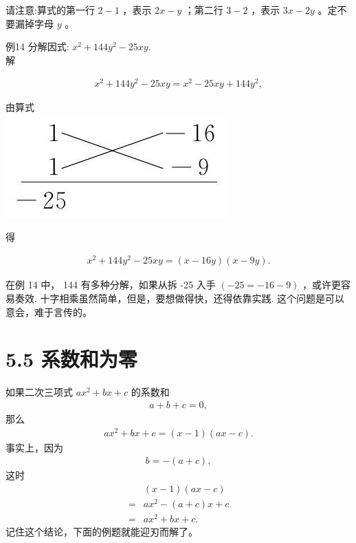 \documentclass[10pt]{article}
\begin{document}
请注意:算式的第一行 $2-1$ ，表示 $2 x-y$ ；第二行 $3-2$ ，表示 $3 x-2 y$ 。定不要漏掉字母 $y$ 。

例14 分解因式: $x^{2}+144 y^{2}-25 x y$.\\
解

\begin{align*}
x^{2}+144 y^{2}-25 x y=x^{2}-25 x y+144 y^{2},
\end{align*}

由算式\\
\includegraphics[max width=\textwidth, center]{2024_10_30_bd799899fef40368a068g-039}

得

\begin{align*}
x^{2}+144 y^{2}-25 x y=(x-16 y)(x-9 y) .
\end{align*}

在例 14 中， 144 有多种分解，如果从拆 -25 入手 $(-25=-16-9)$ ，或许更容易奏效. 十字相乘虽然简单，但是，要想做得快，还得依靠实践. 这个问题是可以意会，难于言传的。

\section*{5.5 系数和为零}
如果二次三项式 $a x^{2}+b x+c$ 的系数和
\begin{align*}
a+b+c=0,
\end{align*}
那么
\begin{align*}
a x^{2}+b x+c=(x-1)(a x-c) .
\end{align*}
事实上，因为
\begin{align*}
b=-(a+c),
\end{align*}
这时
\begin{align*}
& (x-1)(a x-c) \\
= & a x^{2}-(a+c) x+c \\
= & a x^{2}+b x+c .
\end{align*}
记住这个结论，下面的例题就能迎刃而解了。
\end{document}
